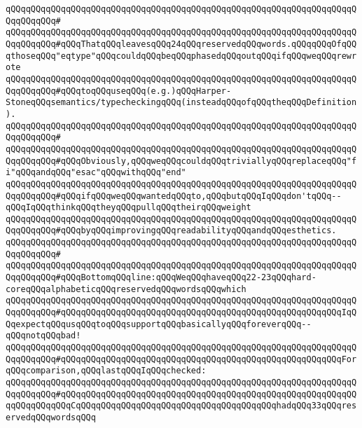 \verb|qQQqqQQqqQQqqQQqqQQqqQQqqQQqqQQqqQQqqQQqqQQqqQQqqQQqqQQqqQQqqQQqqQQqqQQqqQQqqQQq#|\newline
\verb|qQQqqQQqqQQqqQQqqQQqqQQqqQQqqQQqqQQqqQQqqQQqqQQqqQQqqQQqqQQqqQQqqQQqqQQqqQQqqQQq#qQQqThatqQQqleavesqQQq24qQQqreservedqQQqwords.qQQqqQQqOfqQQqthoseqQQq"eqtype"qQQqcouldqQQqbeqQQqphasedqQQqoutqQQqifqQQqweqQQqrewrote|\newline
\verb|qQQqqQQqqQQqqQQqqQQqqQQqqQQqqQQqqQQqqQQqqQQqqQQqqQQqqQQqqQQqqQQqqQQqqQQqqQQqqQQq#qQQqtoqQQquseqQQq(e.g.)qQQqHarper-StoneqQQqsemantics/typecheckingqQQq(insteadqQQqofqQQqtheqQQqDefinition).|\newline
\verb|qQQqqQQqqQQqqQQqqQQqqQQqqQQqqQQqqQQqqQQqqQQqqQQqqQQqqQQqqQQqqQQqqQQqqQQqqQQqqQQq#|\newline
\verb|qQQqqQQqqQQqqQQqqQQqqQQqqQQqqQQqqQQqqQQqqQQqqQQqqQQqqQQqqQQqqQQqqQQqqQQqqQQqqQQq#qQQqObviously,qQQqweqQQqcouldqQQqtriviallyqQQqreplaceqQQq"fi"qQQqandqQQq"esac"qQQqwithqQQq"end"|\newline
\verb|qQQqqQQqqQQqqQQqqQQqqQQqqQQqqQQqqQQqqQQqqQQqqQQqqQQqqQQqqQQqqQQqqQQqqQQqqQQqqQQq#qQQqifqQQqweqQQqwantedqQQqto,qQQqbutqQQqIqQQqdon'tqQQq--qQQqIqQQqthinkqQQqtheyqQQqpullqQQqtheirqQQqweight|\newline
\verb|qQQqqQQqqQQqqQQqqQQqqQQqqQQqqQQqqQQqqQQqqQQqqQQqqQQqqQQqqQQqqQQqqQQqqQQqqQQqqQQq#qQQqbyqQQqimprovingqQQqreadabilityqQQqandqQQqesthetics.|\newline
\verb|qQQqqQQqqQQqqQQqqQQqqQQqqQQqqQQqqQQqqQQqqQQqqQQqqQQqqQQqqQQqqQQqqQQqqQQqqQQqqQQq#|\newline
\verb|qQQqqQQqqQQqqQQqqQQqqQQqqQQqqQQqqQQqqQQqqQQqqQQqqQQqqQQqqQQqqQQqqQQqqQQqqQQqqQQq#qQQqBottomqQQqline:qQQqWeqQQqhaveqQQq22-23qQQqhard-coreqQQqalphabeticqQQqreservedqQQqwordsqQQqwhich|\newline
\verb|qQQqqQQqqQQqqQQqqQQqqQQqqQQqqQQqqQQqqQQqqQQqqQQqqQQqqQQqqQQqqQQqqQQqqQQqqQQqqQQq#qQQqqQQqqQQqqQQqqQQqqQQqqQQqqQQqqQQqqQQqqQQqqQQqqQQqqQQqIqQQqexpectqQQqusqQQqtoqQQqsupportqQQqbasicallyqQQqforeverqQQq--qQQqnotqQQqbad!|\newline
\verb|qQQqqQQqqQQqqQQqqQQqqQQqqQQqqQQqqQQqqQQqqQQqqQQqqQQqqQQqqQQqqQQqqQQqqQQqqQQqqQQq#qQQqqQQqqQQqqQQqqQQqqQQqqQQqqQQqqQQqqQQqqQQqqQQqqQQqqQQqForqQQqcomparison,qQQqlastqQQqIqQQqchecked:|\newline
\verb|qQQqqQQqqQQqqQQqqQQqqQQqqQQqqQQqqQQqqQQqqQQqqQQqqQQqqQQqqQQqqQQqqQQqqQQqqQQqqQQq#qQQqqQQqqQQqqQQqqQQqqQQqqQQqqQQqqQQqqQQqqQQqqQQqqQQqqQQqqQQqqQQqqQQqqQQqCqQQqqQQqqQQqqQQqqQQqqQQqqQQqqQQqqQQqqQQqhadqQQq33qQQqreservedqQQqwordsqQQq|\newline

